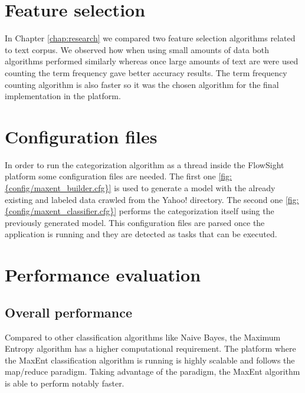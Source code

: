   

\section{Feature selection}
In Chapter \ref{chap:research} we compared two feature selection algorithms related to text corpus. We observed how when using small amounts of data both algorithms performed similarly whereas once
large amounts of text are were used counting the term frequency gave better accuracy results. The term frequency counting algorithm is also faster so it was the chosen algorithm for the final 
implementation in the platform.


\section{Configuration files}
\label{sec:config}
In order to run the categorization algorithm as a thread inside the FlowSight platform some configuration files are needed. The first one \ref{fig:{config/maxent_builder.cfg}} is used to generate a model with the already existing and labeled
data crawled from the Yahoo! directory. The second one \ref{fig:{config/maxent_classifier.cfg}} performs the categorization itself using the previously generated model. This configuration files are
parsed once the application is running and they are detected as tasks that can be executed.



\clearpage
{}

\section{Performance evaluation}
\subsection{Overall performance}
Compared to other classification algorithms like Naive Bayes, the Maximum Entropy algorithm has a higher computational requirement. 
The platform where the MaxEnt classification algorithm is running is highly scalable and follows the map/reduce paradigm. Taking advantage of the paradigm, the MaxEnt algorithm
is able to perform notably faster.




